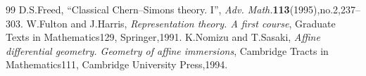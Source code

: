 \documentclass[10pt,a4paper]{amsart}
\theoremstyle{definition}\newtheorem{defi}[theo]{Definition}
\begin{document}
\begin{thebibliography}{99}
 D.S.Freed, ``Classical Chern--Simons theory. I'', \emph{Adv. Math.}\textbf{113}(1995),no.2,237--303.
 W.Fulton and J.Harris, \emph{Representation theory. A first course}, Graduate Texts in Mathematics129, Springer,1991.
 K.Nomizu and T.Sasaki, \emph{Affine differential geometry. Geometry of affine immersions}, Cambridge Tracts in Mathematics111, Cambridge University Press,1994.
\end{thebibliography}
\end{document}
